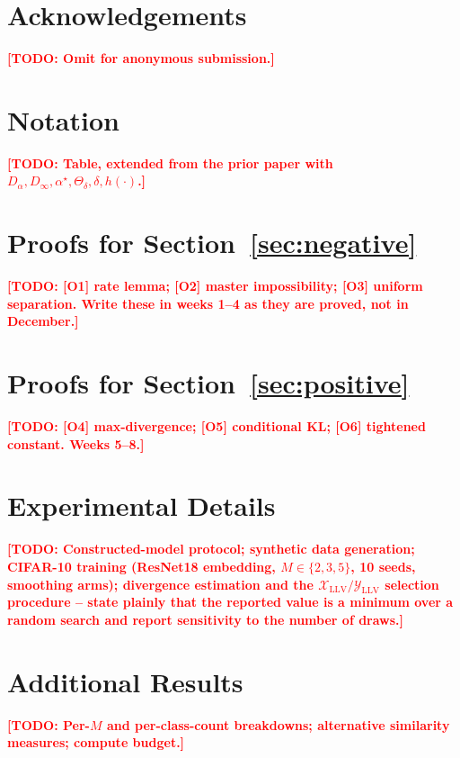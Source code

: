 \documentclass{article}
\newcommand{\TODO}[1]{\textcolor{red}{\textbf{[TODO: #1]}}}
\newcommand{\X}{\mathcal{X}}
\newcommand{\Y}{\mathcal{Y}}
\newcommand{\Dalpha}{D_{\alpha}}
\newcommand{\Dinf}{D_{\infty}}
\newcommand{\Thetadelta}{\Theta_{\delta}}
\theoremstyle{plain}
\theoremstyle{definition}
\theoremstyle{remark}
\begin{document}
\section*{Acknowledgements}
\TODO{Omit for anonymous submission.}




\newpage
\appendix
\onecolumn

\section{Notation}
\label{app:notation}
\TODO{Table, extended from the prior paper with $\Dalpha,\Dinf,\alpha^{\star},
\Thetadelta,\delta,h(\cdot)$.}

\section{Proofs for Section~\ref{sec:negative}}
\label{app:neg}
\TODO{[O1] rate lemma; [O2] master impossibility; [O3] uniform separation.
\textbf{Write these in weeks 1--4 as they are proved, not in December.}}

\section{Proofs for Section~\ref{sec:positive}}
\label{app:pos}
\TODO{[O4] max-divergence; [O5] conditional KL; [O6] tightened constant.
Weeks 5--8.}

\section{Experimental Details}
\label{app:expdetails}
\TODO{Constructed-model protocol; synthetic data generation; CIFAR-10 training
(ResNet18 embedding, $M\in\{2,3,5\}$, 10 seeds, smoothing arms); divergence
estimation and the $\X_{\mathrm{LLV}}/\Y_{\mathrm{LLV}}$ selection procedure --
state plainly that the reported value is a minimum over a random search and
report sensitivity to the number of draws.}

\section{Additional Results}
\label{app:extra}
\TODO{Per-$M$ and per-class-count breakdowns; alternative similarity measures;
compute budget.}
\end{document}
